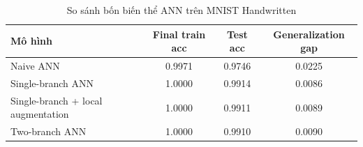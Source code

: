 \begin{table}[H]
\centering
\caption{So sánh bốn biến thể ANN trên MNIST Handwritten}
\label{tab:mnist-ann-model-comparison}
\begin{tabular}{l c c c}
\toprule
Mô hình & Final train acc & Test acc & Generalization gap \\
\midrule
Naive ANN & 0.9971 & 0.9746 & 0.0225 \\
Single-branch ANN & 1.0000 & 0.9914 & 0.0086 \\
Single-branch + local augmentation & 1.0000 & 0.9911 & 0.0089 \\
Two-branch ANN & 1.0000 & 0.9910 & 0.0090 \\
\bottomrule
\end{tabular}
\end{table}
